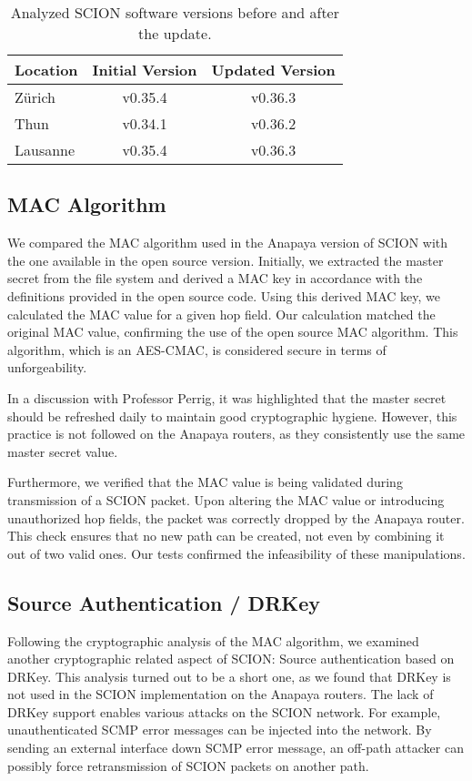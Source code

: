 \begin{table}[H]
    \centering
    \begin{tabular}{|l|c|c|}
        \hline
        \textbf{Location} & \textbf{Initial Version} & \textbf{Updated Version} \\
        \hline
        Zürich & v0.35.4 & v0.36.3 \\
        \hline
        Thun & v0.34.1 & v0.36.2 \\
        \hline
        Lausanne & v0.35.4 & v0.36.3 \\
        \hline
    \end{tabular}
    \caption{Analyzed SCION software versions before and after the update.}
    \label{tab:software_scion_versions}
\end{table}

\subsection{MAC Algorithm}
\label{sec:mac-algorithm}
We compared the MAC algorithm used in the Anapaya version of SCION with the one available in the open source version.
Initially, we extracted the master secret from the file system and derived a MAC key in accordance with the definitions provided in the open source code.
Using this derived MAC key, we calculated the MAC value for a given hop field.
Our calculation matched the original MAC value, confirming the use of the open source MAC algorithm.
This algorithm, which is an AES-CMAC, is considered secure in terms of unforgeability.

In a discussion with Professor Perrig, it was highlighted that the master secret should be refreshed daily to maintain good cryptographic hygiene.
However, this practice is not followed on the Anapaya routers, as they consistently use the same master secret value.

Furthermore, we verified that the MAC value is being validated during transmission of a SCION packet.
Upon altering the MAC value or introducing unauthorized hop fields, the packet was correctly dropped by the Anapaya router.
This check ensures that no new path can be created, not even by combining it out of two valid ones.
Our tests confirmed the infeasibility of these manipulations.



\subsection{Source Authentication / DRKey}
\label{sec:source-authentication}
Following the cryptographic analysis of the MAC algorithm, we examined another cryptographic related aspect of SCION: Source authentication based on DRKey.
This analysis turned out to be a short one, as we found that DRKey is not used in the SCION implementation on the Anapaya routers.
The lack of DRKey support enables various attacks on the SCION network.
For example, unauthenticated SCMP error messages can be injected into the network.
By sending an external interface down SCMP error message, an off-path attacker can possibly force retransmission of SCION packets on another path.



